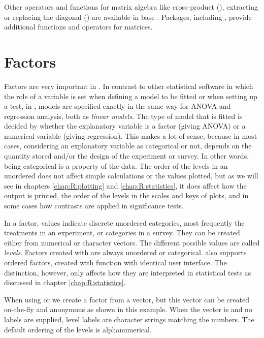 \documentclass[krantz2]{krantz}\usepackage{knitr}
\begin{document}
Other operators and functions for matrix algebra like cross-product (), extracting or replacing the diagonal () are available in base \Rlang. Packages, including , provide additional functions and operators for matrices.




\section{Factors}\label{sec:calc:factors}
Factors are very important in \Rlang. In contrast to other statistical software in which the role of a variable is set when defining a model to be fitted or when setting up a test, in \Rlang, models are specified exactly in the same way for ANOVA and regression analysis, both as \emph{linear models}. The type of model that is fitted is decided by whether the explanatory variable is a factor (giving ANOVA) or a numerical variable (giving regression). This makes a lot of sense, because in most cases, considering an explanatory variable as categorical or not, depends on the quantity stored and/or the design of the experiment or survey. In other words, being categorical is a property of the data. The order of the levels in an unordered  does not affect simple calculations or the values plotted, but as we will see in chapters \ref{chap:R:plotting} and \ref{chap:R:statistics}, it does affect how the output is printed, the order of the levels in the scales and keys of plots, and in some cases how contrasts are applied in significance tests.

In a factor, values indicate discrete unordered categories, most frequently the treatments in an experiment, or categories in a survey. They can be created either from numerical or character vectors. The different possible values are called \emph{levels}. Factors created with  are always unordered or categorical. \Rlang also supports ordered factors, created with function  with identical user interface. The distinction, however, only affects how they are interpreted in statistical tests as discussed in chapter \ref{chap:R:statistics}. 

When using  or  we create a factor from a vector, but this vector can be created on-the-fly and anonymous as shown in this example. When the vector is  and no labels are supplied, level labels are character strings matching the numbers. The default ordering of the levels is alphanumerical.
\end{document}
